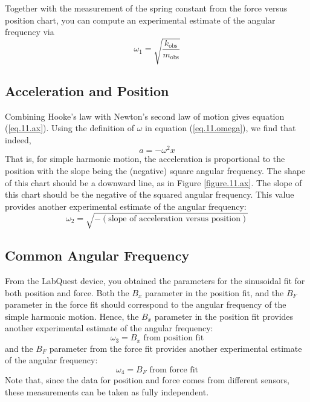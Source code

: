 Together with the measurement of the spring constant from the force versus position chart, you can compute an experimental estimate of the angular frequency via
\begin{equation}
    \omega_{1} = \sqrt{\frac{k_{\text{obs}}}{m_{\text{obs}}}}
\end{equation}
%
\subsection{Acceleration and Position}
%
Combining Hooke's law with Newton's second law of motion gives equation (\ref{eq.11.ax}). Using the definition of $\omega$ in equation (\ref{eq.11.omega}), we find that indeed,
\begin{equation}
    a = -\omega^{2}x
\end{equation}
That is, for simple harmonic motion, the acceleration is proportional to the position with the slope being the (negative) square angular frequency. The shape of this chart should be a downward line, as in Figure \ref{figure.11.ax}. The slope of this chart should be the negative of the squared angular frequency. This value provides another experimental estimate of the angular frequency:
\begin{equation}
    \omega_{2} = \sqrt{- (\text{slope of acceleration versus position})}
\end{equation}
%
\subsection{Common Angular Frequency}
%
From the LabQuest device, you obtained the parameters for the sinusoidal fit for both position and force. Both the $B_{x}$ parameter in the position fit, and the $B_{F}$ parameter in the force fit should correspond to the angular frequency of the simple harmonic motion. Hence, the $B_{x}$ parameter in the position fit provides another experimental estimate of the angular frequency:
\begin{equation}
    \omega_{3} = B_{x} \text{ from position fit}
\end{equation}
and the $B_{F}$ parameter from the force fit provides another experimental estimate of the angular frequency:
\begin{equation}
    \omega_{4} = B_{F} \text{ from force fit}
\end{equation}
Note that, since the data for position and force comes from different sensors, these measurements can be taken as fully independent.

